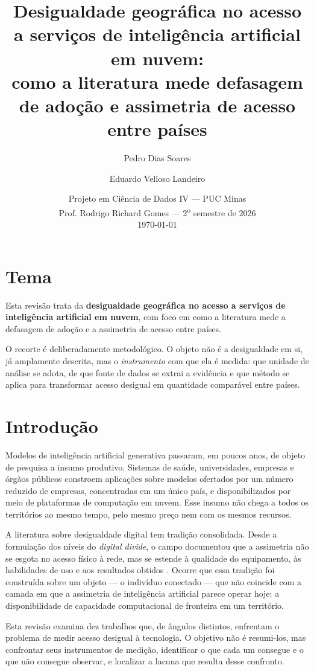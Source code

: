 \documentclass[12pt,a4paper]{article}
\title{\textbf{Desigualdade geográfica no acesso a serviços de inteligência
artificial em nuvem:}\\[0.3em]
\large como a literatura mede defasagem de adoção e assimetria de acesso entre países}
\author{Pedro Dias Soares \and Eduardo Velloso Landeiro}
\date{Projeto em Ciência de Dados IV --- PUC Minas\\
Prof. Rodrigo Richard Gomes --- 2\textsuperscript{o} semestre de 2026\\[0.5em]
\today}
\begin{document}
\maketitle

\section{Tema}

Esta revisão trata da \textbf{desigualdade geográfica no acesso a serviços de
inteligência artificial em nuvem}, com foco em como a literatura mede a defasagem de
adoção e a assimetria de acesso entre países.

O recorte é deliberadamente metodológico. O objeto não é a desigualdade em si, já
amplamente descrita, mas o \emph{instrumento} com que ela é medida: que unidade de
análise se adota, de que fonte de dados se extrai a evidência e que método se aplica
para transformar acesso desigual em quantidade comparável entre países.

\section{Introdução}

Modelos de inteligência artificial generativa passaram, em poucos anos, de objeto de
pesquisa a insumo produtivo. Sistemas de saúde, universidades, empresas e órgãos
públicos constroem aplicações sobre modelos ofertados por um número reduzido de
empresas, concentradas em um único país, e disponibilizados por meio de plataformas de
computação em nuvem. Esse insumo não chega a todos os territórios ao mesmo tempo, pelo
mesmo preço nem com os mesmos recursos.

A literatura sobre desigualdade digital tem tradição consolidada. Desde a formulação
dos níveis do \emph{digital divide}, o campo documentou que a assimetria não se esgota
no acesso físico à rede, mas se estende à qualidade do equipamento, às habilidades de
uso e aos resultados obtidos \cite{vandeursen2018,lutz2019}. Ocorre que essa tradição
foi construída sobre um objeto --- o indivíduo conectado --- que não coincide com a camada
em que a assimetria de inteligência artificial parece operar hoje: a disponibilidade
de capacidade computacional de fronteira em um território.

Esta revisão examina dez trabalhos que, de ângulos distintos, enfrentam o problema de
medir acesso desigual à tecnologia. O objetivo não é resumi-los, mas confrontar seus
instrumentos de medição, identificar o que cada um consegue e o que não consegue
observar, e localizar a lacuna que resulta desse confronto.
\end{document}
